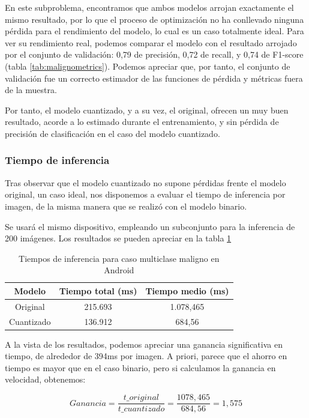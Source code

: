 En este subproblema, encontramos que ambos modelos arrojan exactamente el mismo resultado, por lo que el proceso de optimización no ha conllevado ninguna pérdida para el rendimiento del modelo, lo cual es un caso totalmente ideal. Para ver su rendimiento real, podemos comparar el modelo con el resultado arrojado por el conjunto de validación:  0,79 de precisión,  0,72 de recall, y  0,74 de F1-score (tabla \ref{tab:malignometrics}).  Podemos apreciar que, por tanto, el conjunto de validación fue un correcto estimador de las funciones de pérdida y métricas fuera de la muestra.

Por tanto, el modelo cuantizado, y a su vez, el original, ofrecen un muy buen resultado, acorde a lo estimado durante el entrenamiento, y sin pérdida de precisión de clasificación en el caso del modelo cuantizado. 

\subsubsection{Tiempo de inferencia}

Tras observar que el modelo cuantizado no supone pérdidas frente el modelo original, un caso ideal, nos disponemos a evaluar el tiempo de inferencia por imagen, de la misma manera que se realizó con el modelo binario.

Se usará el mismo dispositivo, empleando un subconjunto para la inferencia de 200 imágenes. Los resultados se pueden apreciar en la tabla \ref{infmal}

\begin{table}[H]
	\centering
	\begin{tabular}{|c|c|c|}
		\hline
		Modelo & Tiempo total (ms) & Tiempo medio (ms) \\ \hline
		Original & 215.693 & 1.078,465	 \\ \hline
		Cuantizado & 136.912 & 684,56 \\ \hline
	\end{tabular}
	\caption{Tiempos de inferencia para caso multiclase maligno en Android}
	\label{infmal}
\end{table}

A la vista de los resultados, podemos apreciar una ganancia significativa en tiempo, de alrededor de 394ms por imagen. A priori, parece que el ahorro en tiempo es mayor que en el caso binario, pero si calculamos la ganancia en velocidad, obtenemos:

$$Ganancia = \frac{t\_original}{t\_cuantizado} = \frac{1078,465}{684,56} = 1,575$$

